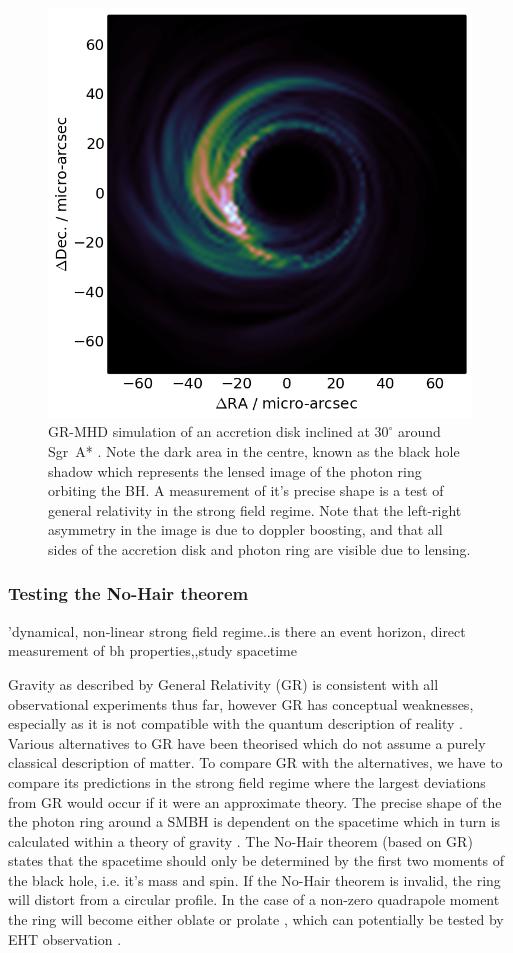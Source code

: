 \begin{figure}
\begin{center}
\includegraphics[width=0.5\columnwidth]{Images/disk30}
\caption{GR-MHD simulation of an accretion disk inclined at $30^\circ$ around Sgr~A* \citep{Moscibrodzka_2014}. Note the dark area in the centre, known as the black hole shadow which represents the lensed image of the photon ring orbiting the BH. A measurement of it's precise shape is a test of general relativity in the strong field regime. Note that the left-right asymmetry in the image is due to doppler boosting, and that all sides of the accretion disk and photon ring are visible due to lensing. \label{fig:grmhd}%
}
\end{center}

\end{figure}
\subsubsection{Testing the No-Hair theorem}
'dynamical, non-linear strong field regime..is there an event horizon, direct measurement of bh properties,,study spacetime

Gravity as described by General Relativity (GR) is consistent with all observational experiments thus far, however GR has conceptual weaknesses, especially as it is not compatible with the quantum description of reality \citep[e.g.][]{Goddi_2016}. Various alternatives to GR have been theorised which do not assume a purely classical description of matter. To compare GR with the alternatives, we have to compare its predictions in the strong field regime where the largest deviations from GR would occur if it were an approximate theory.
The precise shape of the the photon ring around a SMBH is dependent on the spacetime which in turn is calculated within a theory of gravity \citep{Takahashi_2004}. The No-Hair theorem (based on GR) states that the spacetime should only be determined by the first two moments of the black hole, i.e. it's mass and spin. If the No-Hair theorem is invalid, the ring will distort from a circular profile. In the case of a non-zero quadrapole moment the ring will become either oblate or prolate \citep{Johannsen_2010}, which can potentially be tested by EHT observation \citep{Broderick_2014}.


